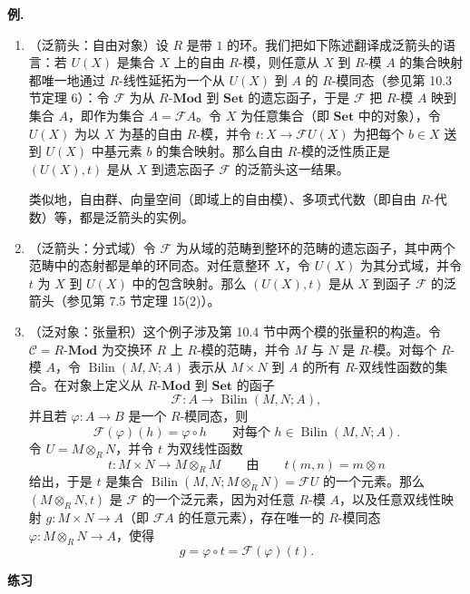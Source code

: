 \noindent\textbf{例.}
\begin{enumerate}[label=(\arabic*)]
  \item （泛箭头：自由对象）设 $R$ 是带 $1$ 的环。我们把如下陈述翻译成泛箭头的语言：若 $U(X)$ 是集合 $X$ 上的自由 $R$-模，则任意从 $X$ 到 $R$-模 $A$ 的集合映射都唯一地通过 $R$-线性延拓为一个从 $U(X)$ 到 $A$ 的 $R$-模同态（参见第 10.3 节定理 6）：令 $\mathcal F$ 为从 $R\text{-}\mathbf{Mod}$ 到 $\mathbf{Set}$ 的遗忘函子，于是 $\mathcal F$ 把 $R$-模 $A$ 映到集合 $A$，即作为集合 $A=\mathcal F A$。令 $X$ 为任意集合（即 $\mathbf{Set}$ 中的对象），令 $U(X)$ 为以 $X$ 为基的自由 $R$-模，并令 $t:X\to\mathcal F U(X)$ 为把每个 $b\in X$ 送到 $U(X)$ 中基元素 $b$ 的集合映射。那么自由 $R$-模的泛性质正是 $(U(X),t)$ 是从 $X$ 到遗忘函子 $\mathcal F$ 的泛箭头这一结果。

  类似地，自由群、向量空间（即域上的自由模）、多项式代数（即自由 $R$-代数）等，都是泛箭头的实例。

  \item （泛箭头：分式域）令 $\mathcal F$ 为从域的范畴到整环的范畴的遗忘函子，其中两个范畴中的态射都是单的环同态。对任意整环 $X$，令 $U(X)$ 为其分式域，并令 $t$ 为 $X$ 到 $U(X)$ 中的包含映射。那么 $(U(X),t)$ 是从 $X$ 到函子 $\mathcal F$ 的泛箭头（参见第 7.5 节定理 15(2)）。

  \item （泛对象：张量积）这个例子涉及第 10.4 节中两个模的张量积的构造。令 $\mathcal C=R\text{-}\mathbf{Mod}$ 为交换环 $R$ 上 $R$-模的范畴，并令 $M$ 与 $N$ 是 $R$-模。对每个 $R$-模 $A$，令 $\operatorname{Bilin}(M,N;A)$ 表示从 $M\times N$ 到 $A$ 的所有 $R$-双线性函数的集合。在对象上定义从 $R\text{-}\mathbf{Mod}$ 到 $\mathbf{Set}$ 的函子
  \[
    \mathcal F:A\longrightarrow \operatorname{Bilin}(M,N;A),
  \]
  并且若 $\varphi:A\to B$ 是一个 $R$-模同态，则
  \[
    \mathcal F(\varphi)(h)=\varphi\circ h
    \qquad\text{对每个 }h\in\operatorname{Bilin}(M,N;A).
  \]
  令 $U=M\otimes_R N$，并令 $t$ 为双线性函数
  \[
    t:M\times N\longrightarrow M\otimes_R M
    \qquad\text{由}\qquad
    t(m,n)=m\otimes n
  \]
  给出，于是 $t$ 是集合 $\operatorname{Bilin}(M,N;M\otimes_R N)=\mathcal F U$ 的一个元素。那么 $(M\otimes_R N,t)$ 是 $\mathcal F$ 的一个泛元素，因为对任意 $R$-模 $A$，以及任意双线性映射 $g:M\times N\to A$（即 $\mathcal F A$ 的任意元素），存在唯一的 $R$-模同态 $\varphi:M\otimes_R N\to A$，使得
  \[
    g=\varphi\circ t=\mathcal F(\varphi)(t).
  \]
\end{enumerate}

\begin{center}
\textbf{练习}
\end{center}

